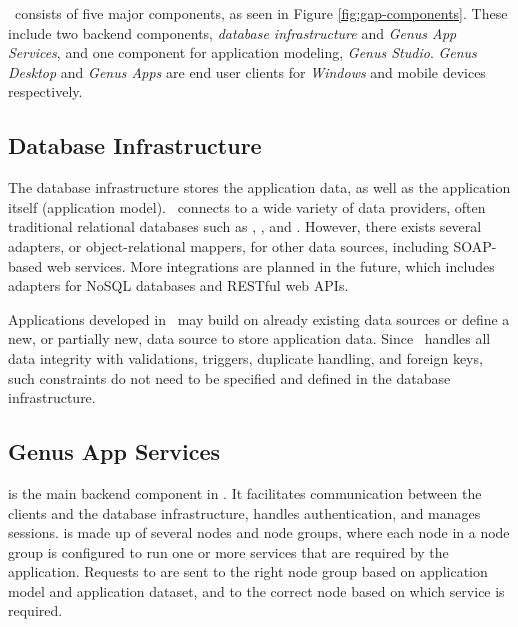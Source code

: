  



\gap~consists of five major components, as seen in Figure \ref{fig:gap-components}. These include two backend components, \textit{database infrastructure} and \textit{Genus App Services}, and one component for application modeling, \textit{Genus Studio}. \textit{Genus Desktop} and \textit{Genus Apps} are end user clients for \textit{Windows} and mobile devices respectively.

\subsection{Database Infrastructure}
\label{sub:Database Infrastructure}
The database infrastructure stores the application data, as well as the application itself (application model). \gap~connects to a wide variety of data providers, often traditional relational databases such as , , and . However, there exists several adapters, or object-relational mappers, for other data sources, including SOAP-based web services. More integrations are planned in the future, which includes adapters for NoSQL databases and RESTful web APIs. 

Applications developed in \gap~may build on already existing data sources or define a new, or partially new, data source to store application data. Since \gap~handles all data integrity with validations, triggers, duplicate handling, and foreign keys, such constraints do not need to be specified and defined in the database infrastructure.


\subsection{Genus App Services}
\label{sub:Genus App Services}
 is the main backend component in \gap. It facilitates communication between the clients and the database infrastructure, handles authentication, and manages sessions.  is made up of several nodes and node groups, where each node in a node group is configured to run one or more services that are required by the application. Requests to  are sent to the right node group based on application model and application dataset, and to the correct node based on which service is required. 

